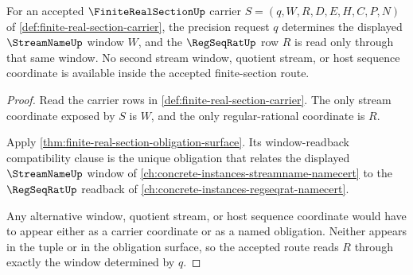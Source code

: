 \begin{theorem}
\label{thm:finite-real-section-window-readback-determinacy}
For an accepted $\FiniteRealSectionUp$ carrier $S=(q,W,R,D,E,H,C,P,N)$ of \autoref{def:finite-real-section-carrier}, the precision request $q$ determines the displayed $\StreamNameUp$ window $W$, and the $\RegSeqRatUp$ row $R$ is read only through that same window. No second stream window, quotient stream, or host sequence coordinate is available inside the accepted finite-section route.
\end{theorem}
\begin{proof}
Read the carrier rows in \autoref{def:finite-real-section-carrier}. The only stream coordinate exposed by $S$ is $W$, and the only regular-rational coordinate is $R$.

Apply \autoref{thm:finite-real-section-obligation-surface}. Its window-readback compatibility clause is the unique obligation that relates the displayed $\StreamNameUp$ window of \autoref{ch:concrete-instances-streamname-namecert} to the $\RegSeqRatUp$ readback of \autoref{ch:concrete-instances-regseqrat-namecert}.

Any alternative window, quotient stream, or host sequence coordinate would have to appear either as a carrier coordinate or as a named obligation. Neither appears in the tuple or in the obligation surface, so the accepted route reads $R$ through exactly the window determined by $q$.
\end{proof}


